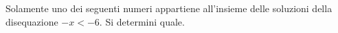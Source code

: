 Solamente uno dei seguenti numeri appartiene all'insieme delle soluzioni 
della disequazione $-x < -6$. Si determini quale.